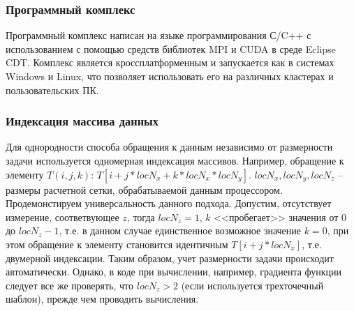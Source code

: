 \subsubsection*{Программный комплекс}
Программный комплекс написан на языке
программирования С/C++ с использованием с помощью средств
библиотек MPI и CUDA в среде Eclipse CDT. Комплекс является
кроссплатформенным и запускается как в системах Windows и Linux, что
позволяет использовать его на различных кластерах и пользовательских ПК.

\subsubsection*{Индексация массива данных}
Для однородности способа обращения к данным независимо
от размерности задачи используется одномерная индексация массивов.
Например, обращение к элементу $T(i,j,k)$:
$T[i + j * locN_x + k * locN_x * locN_y]$.
$locN_x, locN_y, locN_z$ -- размеры расчетной сетки, обрабатываемой
данным процессором. Продемонстируем универсальность данного
подхода. Допустим, отсутствует измерение, соответвующее $z$, тогда
$locN_z=1$, $k$ <<пробегает>> значения от $0$ до $locN_z-1$, т.е.
в данном случае единственное возможное значение $k=0$, при этом
обращение к элементу становится идентичным $T[i + j * locN_x]$, т.е.
двумерной индексации. Таким образом, учет размерности задачи
происходит автоматически. Однако, в коде при вычислении,
например, градиента функции следует все же проверять, что $locN_z > 2$
(если используется трехточечный шаблон),
прежде чем проводить вычисления.

